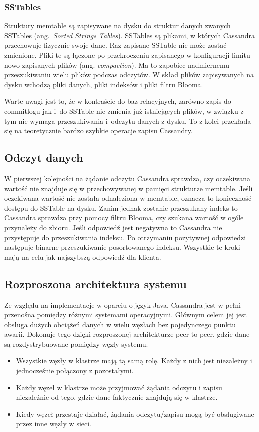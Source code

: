 \subsubsection{SSTables}

Struktury memtable są zapisywane na dysku do struktur danych zwanych SSTables (ang.~\textit{Sorted Strings Tables}).
SSTables są plikami, w których Cassandra przechowuje fizycznie swoje dane.
Raz zapisane SSTable nie może zostać zmienione.
Pliki te są łączone po przekroczeniu zapisanego w konfiguracji limitu nowo zapisanych plików (ang. \textit{compaction}).
Ma to zapobiec nadmiernemu przeszukiwaniu wielu plików podczas odczytów.
W skład plików zapisywanych na dysku wchodzą pliki danych, pliki indeksów i pliki filtru Blooma.

Warte uwagi jest to, że w kontraście do baz relacyjnych, zarówno zapis do commitlogu jak i~do SSTable nie zmienia już istniejących plików, w związku z tym nie wymaga przeszukiwania i~odczytu danych z dysku.
To z kolei przekłada się na teoretycznie bardzo szybkie operacje zapisu Cassandry.

\subsection{Odczyt danych}

W pierwszej kolejności na żądanie odczytu Cassandra sprawdza, czy oczekiwana wartość nie znajduje się w przechowywanej w pamięci strukturze memtable.
Jeśli oczekiwana wartość nie została odnaleziona w memtable, oznacza to konieczność dostępu do SSTable na dysku.
Zanim jednak zostanie przeszukany indeks to Cassandra sprawdza przy pomocy filtru Blooma, czy szukana wartość w ogóle przynależy do zbioru. 
Jeśli odpowiedź jest negatywna to Cassandra nie przystępuje do przeszukiwania indeksu.
Po otrzymaniu pozytywnej odpowiedzi następuje binarne przeszukiwanie posortowanego indeksu.
Wszystkie te kroki mają na celu jak najszybszą odpowiedź dla klienta.

\subsection{Rozproszona architektura systemu}

Ze względu na implementacje w oparciu o język Java, Cassandra jest w pełni przenośna pomiędzy różnymi systemami operacyjnymi. 
Głównym celem jej jest obsługa dużych obciążeń danych w wielu węzłach bez pojedynczego punktu awarii.
Dokonuje tego dzięki rozproszonej architekturze peer-to-peer, gdzie dane są rozdystrybuowane pomiędzy węzły systemu.
\begin{itemize}
    \item Wszystkie węzły w klastrze mają tą samą rolę. Każdy z nich jest niezależny i jednocześnie połączony z pozostałymi.
    \item Każdy węzeł w klastrze może przyjmować żądania odczytu i zapisu niezależnie od tego, gdzie dane faktycznie znajdują się w klastrze.
    \item Kiedy węzeł przestaje działać, żądania odczytu/zapisu mogą być obsługiwane przez inne węzły w sieci.
\end{itemize}

